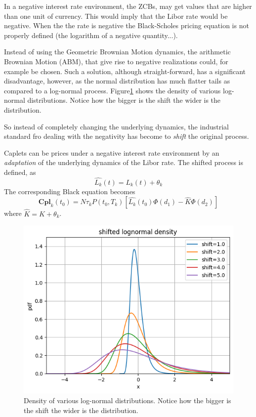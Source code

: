 \documentclass[12pt,a4paper]{book}
\begin{document}
In a negative interest rate environment, the ZCBs, may get values that are higher than one unit of currency. This would imply that the Libor rate would be negative. When the the rate is negative the Black-Scholes pricing equation is not properly defined (the logarithm of a negative quantity...).

Instead of using the Geometric Brownian Motion dynamics, the arithmetic Brownian Motion (ABM), that give rise to negative realizations could, for example be chosen. Such a solution, although straight-forward, has a significant disadvantage, however, as the normal distribution has much flatter tails as compared to a log-normal process. Figure\ref{fig:lognormal_shifted} shows the density of various log-normal  distributions. Notice how the bigger is the shift the wider is the distribution.

So instead of completely changing the underlying dynamics, the industrial standard fro dealing with the negativity has become to \emph{shift} the original process.

Caplets can be prices under a negative interest rate environment by an \emph{adaptation} of the underlying dynamics of the Libor rate. The shifted process is defined, as
\begin{equation}
\hat{L_k}(t) = L_k(t) + \theta_k
\end{equation}
The corresponding Black equation becomes
\begin{equation}
	\textbf{Cpl}_k(t_0) = N\tau_k P(t_0, T_k)\left[\hat{L_k}(t_0)\Phi(d_1)-\hat{K}\Phi(d_2)\right] 
\end{equation}
where $\hat{K} = K + \theta_k$.

\begin{figure}[htbp]
\begin{center}
	\includegraphics[width=0.6\linewidth]{addons/lognormal_shifted}
\end{center}
\caption{Density of various log-normal  distributions. Notice how the bigger is the shift the wider is the distribution.}
\label{fig:lognormal_shifted}
\end{figure}
\end{document}
